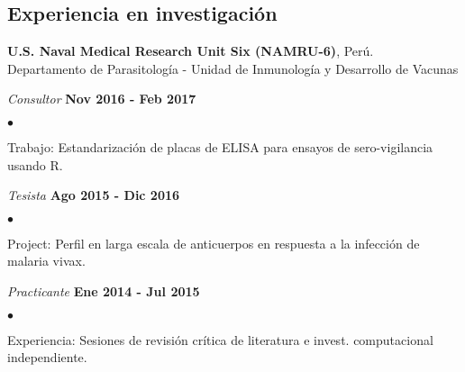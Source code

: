 \documentclass[margin,line]{res}
\newenvironment{list1}{
	\begin{list}{\ding{113}}{%
			\setlength{\itemsep}{0in}
			\setlength{\parsep}{0in} \setlength{\parskip}{0in}
			\setlength{\topsep}{0in} \setlength{\partopsep}{0in}
			\setlength{\leftmargin}{0.17in}}}{\end{list}}
\newenvironment{list2}{
	\begin{list}{$\bullet$}{%
			\setlength{\itemsep}{0in}
			\setlength{\parsep}{0in} \setlength{\parskip}{0in}
			\setlength{\topsep}{0in} \setlength{\partopsep}{0in}
			\setlength{\leftmargin}{0.2in}}}{\end{list}}
\begin{document}
\begin{resume}
		
		\section{\sc Experiencia en investigación}
		
		{\bf U.S. Naval Medical Research Unit Six (NAMRU-6)}, Perú.\\
		Departamento de Parasitología - Unidad de Inmunología y Desarrollo de Vacunas\\
		\vspace*{-.1in}
		\begin{list1}
			\item[] {\em Consultor} \hfill {\bf Nov 2016 - Feb 2017}\\
			\vspace*{-.1in}
			\begin{list2}
				\item Trabajo: Estandarización de placas de ELISA para ensayos de sero-vigilancia usando R.\\
			\end{list2}
			\vspace*{-.1in}
			\item[] {\em Tesista} \hfill {\bf Ago 2015 - Dic 2016}\\
			\vspace*{-.1in}
			\begin{list2}
				\item Project: Perfil en larga escala de anticuerpos en respuesta a la infección de malaria vivax.\\
			\end{list2}
			\vspace*{-.1in}
			\item[] {\em Practicante} \hfill {\bf Ene 2014 - Jul 2015}\\
			\vspace*{-.1in}
			\begin{list2} %
				\item Experiencia: Sesiones de revisión crítica de literatura e invest. computacional independiente.
			\end{list2}
		\end{list1}
		

\end{resume}
\end{document}
